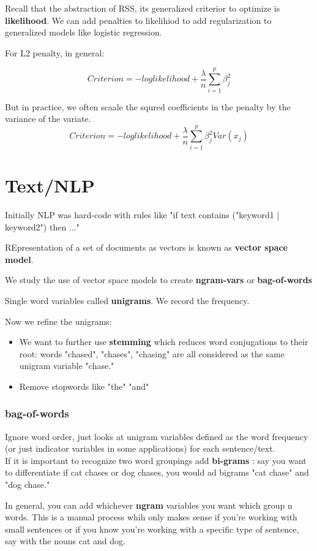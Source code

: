 \documentclass{article}
\begin{document}
Recall that the abstraction of RSS, its generalized  criterior to optimize is \textbf{likelihood}. We can add penalties to likelihiod to add regularization to generalized models like logistic regression.

For L2 penalty, in general:

\[Criterion =  -loglikelihood + \frac{\lambda}{n} \sum_{i=1}^p \beta_j^2\]

But in practice, we often scaale the squred coefficients in the penalty by the variance of the variate. 
\[Criterion =  -loglikelihood + \frac{\lambda}{n} \sum_{i=1}^p \beta_j^2 Var(x_j)\]


\section{Text/NLP}
Initially NLP was hard-code with rules like "if text contains ("keyword1 | keyword2") then ..."

REpresentation of a set of documents as vectors is known as \textbf{vector space model}. 

We study the use of vector space models to create \textbf{ngram-vars} or \textbf{bag-of-words}

Single word variables called \textbf{unigrams}. We record the frequency. 

Now we refine the unigrams: 
\begin{itemize}
\item We want to further use \textbf{stemming} which reduces word conjugations to their root: words "chased", "chases", "chasing" are all considered as the same unigram variable "chase." 
\item Remove stopwords like "the" "and"
\end{itemize}

\subsubsection{bag-of-words}
Ignore word order, just looks at unigram variables defined as the word frequency (or just indicator variables in some applications) for each sentence/text. \\

If it is important to recognize two word groupings add \textbf{bi-grams} : say you want to differentiate if cat chases or dog chases, you would ad bigrams "cat chase" and "dog chase." 

In general, you can add whichever \textbf{ngram} variables you want which group n words. This is a manual process whih only makes sense if you're working with small sentences or if you know you're working with a specific type of sentence, say with the nouns cat and dog. \\
\end{document}
